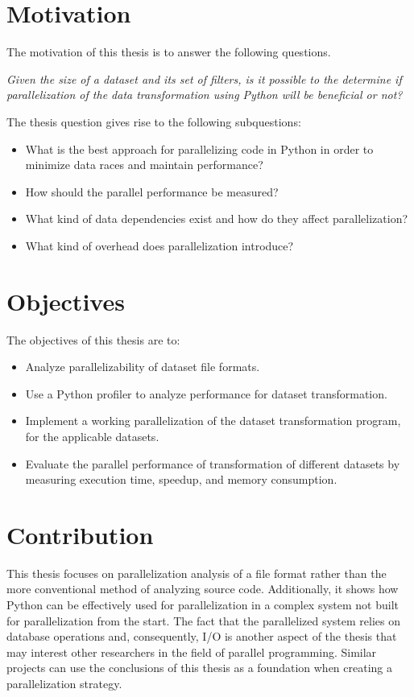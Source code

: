 \section{Motivation}
The motivation of this thesis is to answer the following questions.

\emph{Given the size of a dataset and its set of filters, is it possible to the determine 
if parallelization of the data transformation using Python will be beneficial or not?}

The thesis question gives rise to the following subquestions:
\begin{itemize}
    \item What is the best approach for parallelizing code in Python in order to minimize data races and maintain performance?
    \item How should the parallel performance be measured?
    \item What kind of data dependencies exist and how do they affect parallelization?
    \item What kind of overhead does parallelization introduce?
\end{itemize}

\section{Objectives}
The objectives of this thesis are to:
\begin{itemize}
    \item Analyze parallelizability of dataset file formats.
    \item Use a Python profiler to analyze  performance for dataset transformation.
    \item Implement a working parallelization of the dataset transformation program, for the applicable datasets.
    \item Evaluate the parallel performance of transformation of different datasets by measuring execution time, speedup, and memory consumption.
\end{itemize}

\section{Contribution}
This thesis focuses on parallelization analysis of a file format rather than the more conventional method of analyzing source code. Additionally,
it shows how Python can be effectively used for parallelization in a complex system not built for parallelization from the start. The fact that
the parallelized system relies on database operations and, consequently, I/O is another aspect of the thesis that may interest other researchers
in the field of parallel programming. Similar projects can use the conclusions of this thesis as a foundation when creating a parallelization strategy.
